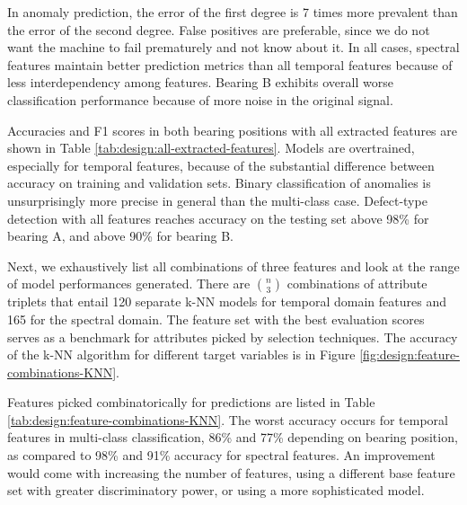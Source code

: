 In anomaly prediction, the error of the first degree is 7 times more prevalent than the error of the second degree. False positives are preferable, since we do not want the machine to fail prematurely and not know about it. In all cases, spectral features maintain better prediction metrics than all temporal features because of less interdependency among features. Bearing B exhibits overall worse classification performance because of more noise in the original signal.

Accuracies and F1 scores in both bearing positions with all extracted features are shown in Table \ref{tab:design:all-extracted-features}. Models are overtrained, especially for temporal features, because of the substantial difference between accuracy on training and validation sets. Binary classification of anomalies is unsurprisingly more precise in general than the multi-class case. Defect-type detection with all features reaches accuracy on the testing set above 98\% for bearing A, and above 90\% for bearing B.

Next, we exhaustively list all combinations of three features and look at the range of model performances generated. There are $\binom{n}{3}$ combinations of attribute triplets that entail 120 separate k-NN models for temporal domain features and 165 for the spectral domain. The feature set with the best evaluation scores serves as a benchmark for attributes picked by selection techniques. The accuracy of the k-NN algorithm for different target variables is in Figure \ref{fig:design:feature-combinations-KNN}. 



Features picked combinatorically for predictions are listed in Table \ref{tab:design:feature-combinations-KNN}. The worst accuracy occurs for temporal features in multi-class classification, 86\% and 77\% depending on bearing position, as compared to 98\% and 91\% accuracy for spectral features. An improvement would come with increasing the number of features, using a different base feature set with greater discriminatory power, or using a more sophisticated model.

